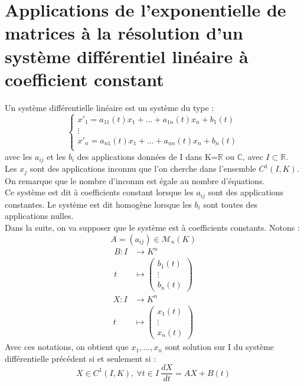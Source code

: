 \section{Applications de l'exponentielle de matrices à la résolution d'un système différentiel linéaire à coefficient constant}
\begin{de}
Un système différentielle linéaire est un système du type : 
$$\begin{cases}
   x'_1 = a_{11}(t)x_1 + \dots + a_{1n}(t)x_n + b_1(t) \\
  \vdots\\
  x'_n = a_{n1}(t)x_1 + \dots + a_{nn}(t)x_n + b_n(t) \\
  \end{cases}
$$
avec les $a_{ij}$ et les $b_i$ des applications données de I dans K=$\mathbb{R}$ ou $\mathbb{C}$, avec $I \subset \mathbb{R}$.\\
Les $x_j$ sont des applications inconnu que l'on cherche dans l'ensemble $C^1(I,K)$. On remarque que le nombre d'inconnu est égale au nombre d'équations.\\
Ce système est dit à coefficients constant lorsque les $a_{ij}$ sont des applications constantes. Le système est dit homogène lorsque les $b_i$ sont toutes des applications nulles.\\
Dans la suite, on va supposer que le système est à coefficients constants. Notons : 
$$A = (a_{ij})\in \mathcal{M}_n(K)$$
\begin{align*}
 B : I &\rightarrow K^n \\
     t &\mapsto \begin{pmatrix}
                 b_1(t) \\
		 \vdots \\
		 b_n(t)
                \end{pmatrix}
\end{align*}
\begin{align*}
 X : I &\rightarrow K^n \\
     t &\mapsto \begin{pmatrix}
                 x_1(t) \\
		 \vdots \\
		 x_n(t)
                \end{pmatrix}
\end{align*}
Avec ces notations, on obtient que $x_1, \dots, x_n$ sont solution sur I du système différentielle précédent si et seulement si : 
$$X \in C^1(I,K),~ \forall t \in I~ \dfrac{dX}{dt} = AX + B(t)$$
\end{de}
